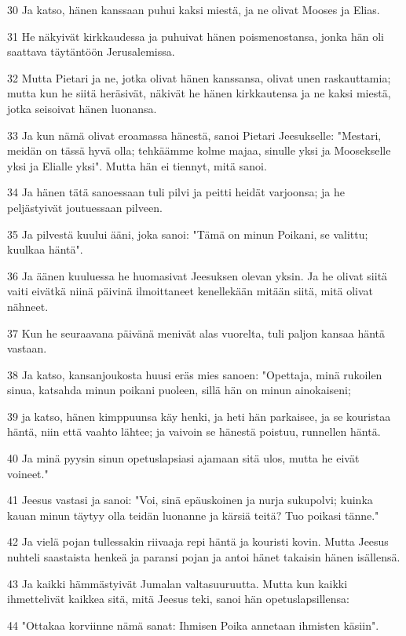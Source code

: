 \par 30 Ja katso, hänen kanssaan puhui kaksi miestä, ja ne olivat Mooses ja Elias.
\par 31 He näkyivät kirkkaudessa ja puhuivat hänen poismenostansa, jonka hän oli saattava täytäntöön Jerusalemissa.
\par 32 Mutta Pietari ja ne, jotka olivat hänen kanssansa, olivat unen raskauttamia; mutta kun he siitä heräsivät, näkivät he hänen kirkkautensa ja ne kaksi miestä, jotka seisoivat hänen luonansa.
\par 33 Ja kun nämä olivat eroamassa hänestä, sanoi Pietari Jeesukselle: "Mestari, meidän on tässä hyvä olla; tehkäämme kolme majaa, sinulle yksi ja Moosekselle yksi ja Elialle yksi". Mutta hän ei tiennyt, mitä sanoi.
\par 34 Ja hänen tätä sanoessaan tuli pilvi ja peitti heidät varjoonsa; ja he peljästyivät joutuessaan pilveen.
\par 35 Ja pilvestä kuului ääni, joka sanoi: "Tämä on minun Poikani, se valittu; kuulkaa häntä".
\par 36 Ja äänen kuuluessa he huomasivat Jeesuksen olevan yksin. Ja he olivat siitä vaiti eivätkä niinä päivinä ilmoittaneet kenellekään mitään siitä, mitä olivat nähneet.
\par 37 Kun he seuraavana päivänä menivät alas vuorelta, tuli paljon kansaa häntä vastaan.
\par 38 Ja katso, kansanjoukosta huusi eräs mies sanoen: "Opettaja, minä rukoilen sinua, katsahda minun poikani puoleen, sillä hän on minun ainokaiseni;
\par 39 ja katso, hänen kimppuunsa käy henki, ja heti hän parkaisee, ja se kouristaa häntä, niin että vaahto lähtee; ja vaivoin se hänestä poistuu, runnellen häntä.
\par 40 Ja minä pyysin sinun opetuslapsiasi ajamaan sitä ulos, mutta he eivät voineet."
\par 41 Jeesus vastasi ja sanoi: "Voi, sinä epäuskoinen ja nurja sukupolvi; kuinka kauan minun täytyy olla teidän luonanne ja kärsiä teitä? Tuo poikasi tänne."
\par 42 Ja vielä pojan tullessakin riivaaja repi häntä ja kouristi kovin. Mutta Jeesus nuhteli saastaista henkeä ja paransi pojan ja antoi hänet takaisin hänen isällensä.
\par 43 Ja kaikki hämmästyivät Jumalan valtasuuruutta. Mutta kun kaikki ihmettelivät kaikkea sitä, mitä Jeesus teki, sanoi hän opetuslapsillensa:
\par 44 "Ottakaa korviinne nämä sanat: Ihmisen Poika annetaan ihmisten käsiin".

